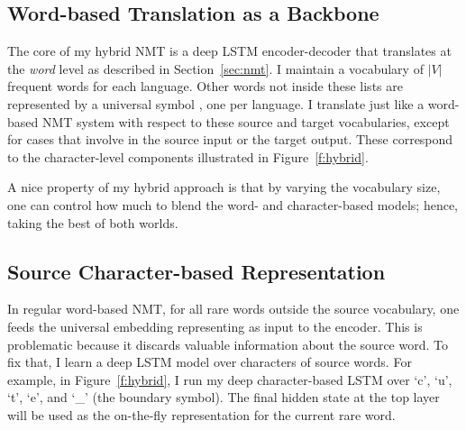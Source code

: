 \subsection{Word-based Translation as a Backbone}
\label{subsec:hybrid_word}

The core of my hybrid NMT is a deep LSTM encoder-decoder that translates at
the {\it word} level as described in Section~\ref{sec:nmt}. I maintain a
vocabulary of $|V|$ frequent words for each language. Other words not inside these
lists are represented by a universal symbol \unk{}, one per language.
I translate just like a word-based NMT system with respect to these source and
target vocabularies, except for cases that involve \unk{} in the source input or 
the target output. These correspond to the character-level components 
illustrated in Figure~\ref{f:hybrid}.

A nice property of my hybrid approach is that by varying the vocabulary size,
 one can control how much to blend the
word- and character-based models; hence, taking the best of both
worlds. 


\subsection{Source Character-based Representation}
\label{subsec:src}
In regular word-based
NMT, for all rare words outside the source vocabulary, one feeds the
universal embedding representing \unk{} as input to the encoder. This is
problematic because it discards valuable information about the source word. To
fix that, I learn a deep LSTM model over characters
of source words. 
For example, in Figure~\ref{f:hybrid}, I run
my deep character-based LSTM over `c', `u', `t', `e', and `\_' (the boundary
symbol). The final hidden state at the top layer will be used as the on-the-fly
representation for the current rare word.

